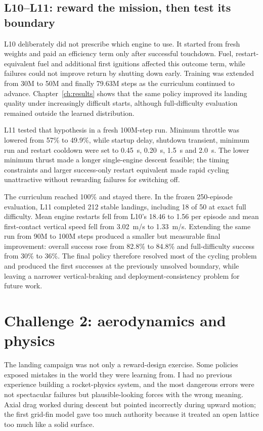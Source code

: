 \subsection{L10--L11: reward the mission, then test its boundary}

L10 deliberately did not prescribe which engine to use. It started from fresh weights and paid
an efficiency term only after successful touchdown. Fuel, restart-equivalent fuel and additional
first ignitions affected this outcome term, while failures could not improve return by shutting
down early. Training was extended from 30M to 50M and finally 79.63M steps as the curriculum
continued to advance. Chapter~\ref{ch:results} shows that the same policy improved its landing
quality under increasingly difficult starts, although full-difficulty evaluation remained
outside the learned distribution.

L11 tested that hypothesis in a fresh 100M-step run. Minimum throttle was lowered from 57\% to
49.9\%, while startup delay, shutdown transient, minimum run and restart cooldown were set to
\SI{0.45}{s}, \SI{0.20}{s}, \SI{1.5}{s} and \SI{2.0}{s}. The lower minimum thrust made a longer
single-engine descent feasible; the timing constraints and larger success-only restart
equivalent made rapid cycling unattractive without rewarding failures for switching off.

The curriculum reached 100\% and stayed there. In the frozen 250-episode evaluation, L11
completed 212 stable landings, including 18 of 50 at exact full difficulty. Mean engine restarts
fell from L10's 18.46 to 1.56 per episode and mean first-contact vertical speed fell from
\SI{3.02}{m/s} to \SI{1.33}{m/s}. Extending the same run from 90M to 100M steps produced a
smaller but measurable final improvement: overall success rose from 82.8\% to 84.8\% and
full-difficulty success from 30\% to 36\%. The final policy therefore resolved most of the
cycling problem and produced the first successes at the previously unsolved boundary, while
leaving a narrower
vertical-braking and deployment-consistency problem for future work.

\section{Challenge 2: aerodynamics and physics}

The landing campaign was not only a reward-design exercise. Some policies exposed mistakes in
the world they were learning from. I had no previous experience building a rocket-physics system,
and the most dangerous errors were not spectacular failures but plausible-looking forces with
the wrong meaning. Axial drag worked during descent but pointed incorrectly during upward motion;
the first grid-fin model gave too much authority because it treated an open lattice too much like
a solid surface.

